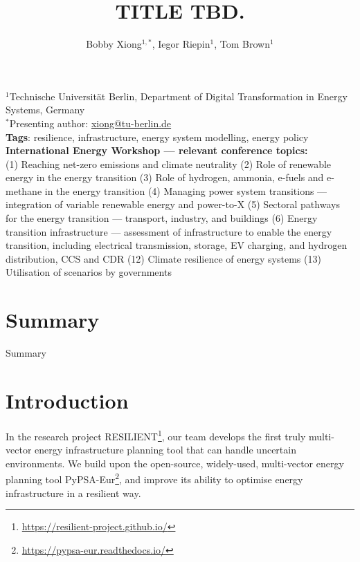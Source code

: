 \documentclass[10pt]{article}
\title{\renewcommand{\baselinestretch}{1.17}\normalsize\bf%
\uppercase{Title tbd.}
}
\author{%
Bobby Xiong$^{1,*}$, Iegor Riepin$^{1}$, Tom Brown$^{1}$\\ 
}
\begin{document}
\date{}

\maketitle

\vspace{-0.5cm}

\begin{center}
{\footnotesize 
$^1$Technische Universität Berlin, Department of Digital Transformation in Energy Systems, Germany \\
$^*$Presenting author: \href{mailto:xiong@tu-berlin.de}{xiong@tu-berlin.de}
}\\
\bigskip
\footnotesize
\textbf{Tags}: resilience, infrastructure, energy system modelling, energy policy \\
\bigskip
\textbf{ International Energy Workshop --- relevant conference topics:}\\(1) Reaching net-zero emissions and climate neutrality \textbullet{} (2) Role of renewable energy in the energy transition \textbullet{} (3) Role of hydrogen, ammonia, e-fuels and e-methane in the energy transition \textbullet{} (4) Managing power system transitions --- integration of variable renewable energy and power-to-X \textbullet{} (5) Sectoral pathways for the energy transition --- transport, industry, and buildings \textbullet{} (6) Energy transition infrastructure --- assessment of infrastructure to enable the energy transition, including electrical transmission, storage, EV charging, and hydrogen distribution, CCS and CDR \textbullet{} (12) Climate resilience of energy systems \textbullet{} (13) Utilisation of scenarios by governments
\end{center}


\section*{Summary}

Summary

\section*{Introduction}

In the research project RESILIENT\footnote{\href{https://resilient-project.github.io/}{https://resilient-project.github.io/}}, our team develops the first truly multi-vector energy infrastructure planning tool that can handle uncertain environments. We build upon the open-source, widely-used, multi-vector energy planning tool PyPSA-Eur\footnote{\href{https://pypsa-eur.readthedocs.io/en/latest/}{https://pypsa-eur.readthedocs.io/}}, and improve its ability to optimise energy infrastructure in a resilient way. 
\end{document}

